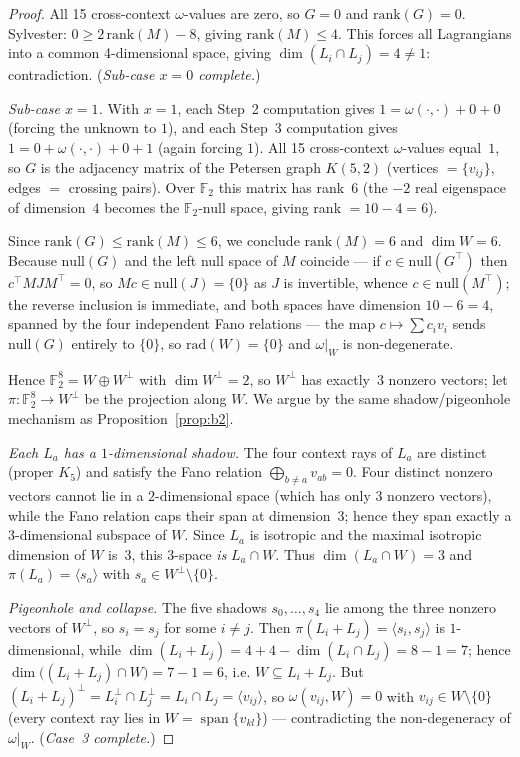 \documentclass[11pt,a4paper]{article}
\theoremstyle{remark}
\begin{document}
\begin{proof}
All 15 cross-context $\omega$-values are zero, so $G = 0$ and $\mathrm{rank}(G) = 0$.
Sylvester: $0 \geq 2\,\mathrm{rank}(M) - 8$, giving $\mathrm{rank}(M) \leq 4$.
This forces all Lagrangians into a common 4-dimensional space, giving
$\dim(L_i \cap L_j) = 4 \neq 1$: contradiction.
\quad (\textit{Sub-case $x=0$ complete.})

\medskip
\noindent\textit{Sub-case $x = 1$.}
With $x=1$, each Step~2 computation gives
$1 = \omega(\cdot,\cdot) + 0 + 0$ (forcing the unknown to $1$),
and each Step~3 computation gives
$1 = 0 + \omega(\cdot,\cdot) + 0 + 1$ (again forcing $1$).
All 15 cross-context $\omega$-values equal~$1$, so $G$ is the adjacency
matrix of the Petersen graph $K(5,2)$ (vertices $= \{v_{ij}\}$, edges $=$
crossing pairs).
Over $\mathbb{F}_2$ this matrix has rank~$6$
(the $-2$ real eigenspace of dimension~$4$ becomes the $\mathbb{F}_2$-null space,
giving rank $= 10 - 4 = 6$).

Since $\mathrm{rank}(G) \leq \mathrm{rank}(M) \leq 6$, we conclude
$\mathrm{rank}(M) = 6$ and $\dim W = 6$.
Because $\mathrm{null}(G)$ and the left null space of $M$ coincide --- if
$c\in\mathrm{null}(G^\top)$ then $c^\top M J M^\top=0$, so $Mc\in\mathrm{null}(J)=\{0\}$
as $J$ is invertible, whence $c\in\mathrm{null}(M^\top)$; the reverse inclusion is
immediate, and both spaces have dimension $10-6=4$, spanned by the four independent
Fano relations --- the map $c \mapsto \sum c_i v_i$ sends $\mathrm{null}(G)$ entirely
to $\{0\}$, so $\mathrm{rad}(W) = \{0\}$ and $\omega|_W$ is non-degenerate.

Hence $\mathbb{F}_2^8 = W \oplus W^\perp$ with $\dim W^\perp = 2$,
so $W^\perp$ has exactly~3 nonzero vectors; let
$\pi\colon \mathbb{F}_2^8 \to W^\perp$ be the projection along $W$.
We argue by the same shadow/pigeonhole mechanism as
Proposition~\ref{prop:b2}.

\emph{Each $L_a$ has a $1$-dimensional shadow.}
The four context rays of $L_a$ are distinct (proper $K_5$) and satisfy the Fano
relation $\bigoplus_{b\neq a} v_{ab}=0$. Four distinct nonzero vectors cannot lie in
a $2$-dimensional space (which has only $3$ nonzero vectors), while the Fano
relation caps their span at dimension~$3$; hence they span exactly a
$3$-dimensional subspace of $W$. Since $L_a$ is isotropic and the maximal isotropic
dimension of $W$ is~$3$, this $3$-space \emph{is} $L_a\cap W$. Thus
$\dim(L_a\cap W)=3$ and $\pi(L_a)=\langle s_a\rangle$ with
$s_a\in W^\perp\setminus\{0\}$.

\emph{Pigeonhole and collapse.}
The five shadows $s_0,\ldots,s_4$ lie among the three nonzero vectors of $W^\perp$,
so $s_i=s_j$ for some $i\neq j$. Then $\pi(L_i+L_j)=\langle s_i,s_j\rangle$ is
$1$-dimensional, while $\dim(L_i+L_j)=4+4-\dim(L_i\cap L_j)=8-1=7$; hence
$\dim\bigl((L_i+L_j)\cap W\bigr)=7-1=6$, i.e. $W\subseteq L_i+L_j$. But
$(L_i+L_j)^\perp=L_i^\perp\cap L_j^\perp=L_i\cap L_j=\langle v_{ij}\rangle$, so
$\omega(v_{ij},W)=0$ with $v_{ij}\in W\setminus\{0\}$ (every context ray lies in
$W=\operatorname{span}\{v_{kl}\}$) --- contradicting the non-degeneracy of
$\omega|_W$.
\quad (\textit{Case~3 complete.})


\end{proof}
\end{document}

